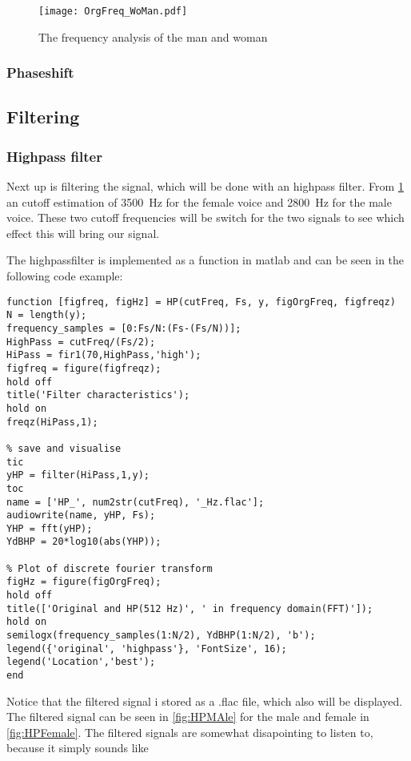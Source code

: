 \begin{figure}[bh]
\centering
\texttt{[image: OrgFreq\_WoMan.pdf]}
\caption{The frequency analysis of the man and woman}
\label{fig:WoManFFT}
\end{figure}

\subsubsection{Phaseshift}


\subsection{Filtering}

\subsubsection{Highpass filter}
Next up is filtering the signal, which will be done with an highpass filter. From \cref{fig:WoManFFT} an cutoff estimation of \SI{3500}{\hertz} for the female voice and \SI{2800}{\hertz} for the male voice. These two cutoff frequencies will be switch for the two signals to see which effect this will bring our signal.

The highpassfilter is implemented as a function in matlab and can be seen in the following code example:

\begin{verbatim}
function [figfreq, figHz] = HP(cutFreq, Fs, y, figOrgFreq, figfreqz)
N = length(y);
frequency_samples = [0:Fs/N:(Fs-(Fs/N))];
HighPass = cutFreq/(Fs/2);
HiPass = fir1(70,HighPass,'high');
figfreq = figure(figfreqz);
hold off
title('Filter characteristics');
hold on
freqz(HiPass,1);

% save and visualise 
tic
yHP = filter(HiPass,1,y);
toc
name = ['HP_', num2str(cutFreq), '_Hz.flac'];
audiowrite(name, yHP, Fs);
YHP = fft(yHP);
YdBHP = 20*log10(abs(YHP));

% Plot of discrete fourier transform
figHz = figure(figOrgFreq);
hold off
title(['Original and HP(512 Hz)', ' in frequency domain(FFT)']);
hold on
semilogx(frequency_samples(1:N/2), YdBHP(1:N/2), 'b');
legend({'original', 'highpass'}, 'FontSize', 16);
legend('Location','best');
end
\end{verbatim}


Notice that the filtered signal i stored as a .flac file, which also will be displayed. The filtered signal can be seen in \cref{fig:HPMAle} for the male and female in \cref{fig:HPFemale}. The filtered signals are somewhat disapointing to listen to, because it simply sounds like 

